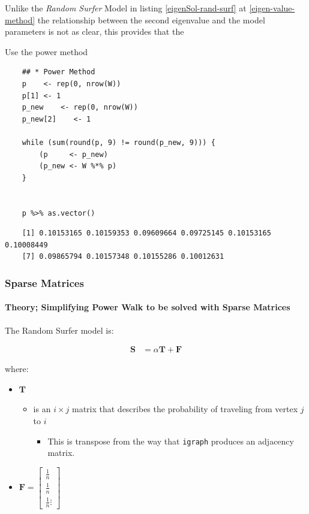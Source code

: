 \documentclass[11pt]{report}
\begin{document}
Unlike the \emph{Random Surfer} Model in listing \ref{eigenSol-rand-surf} at \ref{eigen-value-method} the relationship between the second eigenvalue and the model parameters is not as clear, this provides that the

Use the power method

\begin{tcolorbox}
    \begin{verbatim}
    ## * Power Method
    p    <- rep(0, nrow(W))
    p[1] <- 1
    p_new    <- rep(0, nrow(W))
    p_new[2]    <- 1

    while (sum(round(p, 9) != round(p_new, 9))) {
        (p     <- p_new)
        (p_new <- W %*% p)
    }


    p %>% as.vector()
    \end{verbatim}
\tcblower
    \begin{verbatim}
    [1] 0.10153165 0.10159353 0.09609664 0.09725145 0.10153165 0.10008449
    [7] 0.09865794 0.10157348 0.10155286 0.10012631
    \end{verbatim}
\end{tcolorbox}

\subsubsection{Sparse Matrices}
\label{sec:org5192cbb}
\paragraph{Theory; Simplifying Power Walk to be solved with Sparse Matrices}
\label{sec:org82fb181}
The Random Surfer model is:

$$\begin{aligned}
    \mathbf{S} &= \alpha \mathbf{T} +  \mathbf{F}  \label{eq:sparse-RS}\end{aligned}$$

where:

\begin{itemize}
\item \(\mathbf{T}\)

\begin{itemize}
\item is an \(i \times j\) matrix that describes the probability of
traveling from vertex \(j\) to \(i\)

\begin{itemize}
\item This is transpose from the way that \texttt{igraph} produces an adjacency
matrix.
\end{itemize}
\end{itemize}

\item \(\mathbf{F} = \begin{bmatrix} \frac{1}{n} \\ \frac{1}{n} \\ \frac{1}{n} \vdots \end{bmatrix}\)
\end{itemize}
\end{document}
